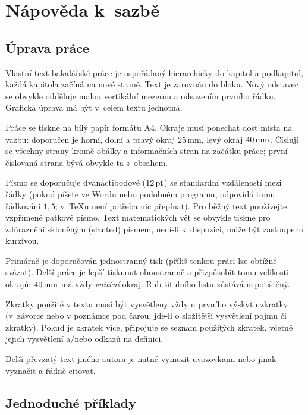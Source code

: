 
\chapter{Nápověda k~sazbě}


\section{Úprava práce}

Vlastní text bakalářské práce je uspořádaný hierarchicky do kapitol a podkapitol, každá kapitola začíná na nové straně.
Text je zarovnán do bloku.
Nový odstavec se obvykle odděluje malou vertikální mezerou a odsazením prvního řádku.
Grafická úprava má být v~celém textu jednotná.

Práce se tiskne na bílý papír formátu A4. Okraje musí ponechat dost místa na vazbu:
doporučen je horní, dolní a pravý okraj $25\,\textrm{mm} $, levý okraj $40\,\rm mm$.
Číslují se všechny strany kromě obálky a informačních stran na začátku práce;
první číslovaná strana bývá obvykle ta s~obsahem.

Písmo se doporučuje dvanáctibodové ($12\,\rm pt$) se standardní vzdáleností mezi řádky
(pokud píšete ve Wordu nebo podobném programu, odpovídá tomu řádkování $1,5$; v~\TeX{}u
není potřeba nic přepínat). Pro běžný text používejte vzpřímené patkové písmo.
Text matematických vět se obvykle tiskne pro zdůraznění skloněným (slanted) písmem,
není-li k~dispozici, může být zastoupeno kurzívou.

Primárně je doporučován jednostranný tisk (příliš tenkou práci lze obtížně svázat).
Delší práce je lepší tisknout oboustranně a přizpůsobit tomu velikosti okrajů:
$40\,\rm mm$ má vždy \emph{vnitřní} okraj. Rub titulního listu zůstává nepotištěný.

Zkratky použité v textu musí být vysvětleny vždy u prvního výskytu zkratky (v~závorce nebo
v poznámce pod čarou, jde-li o složitější vysvětlení pojmu či zkratky). Pokud je zkratek
více, připojuje se seznam použitých zkratek, včetně jejich vysvětlení a/nebo odkazů
na definici.

Delší převzatý text jiného autora je nutné vymezit uvozovkami nebo jinak vyznačit a řádně
citovat.


\section{Jednoduché příklady}

